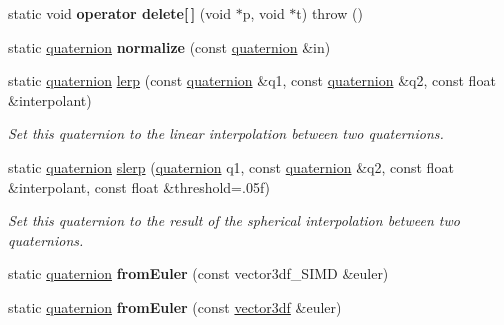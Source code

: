 \begin{DoxyCompactItemize}
\item 
static void {\bfseries operator delete\mbox{[}$\,$\mbox{]}} (void $\ast$p, void $\ast$t)  throw ()\hypertarget{classirr_1_1core_1_1quaternion_abdc0694426887872bbecc1eff5c77279}{}\label{classirr_1_1core_1_1quaternion_abdc0694426887872bbecc1eff5c77279}

\item 
static \hyperlink{classirr_1_1core_1_1quaternion}{quaternion} {\bfseries normalize} (const \hyperlink{classirr_1_1core_1_1quaternion}{quaternion} \&in)\hypertarget{classirr_1_1core_1_1quaternion_a14251b3b9faec080270bf8b8b319862f}{}\label{classirr_1_1core_1_1quaternion_a14251b3b9faec080270bf8b8b319862f}

\item 
static \hyperlink{classirr_1_1core_1_1quaternion}{quaternion} \hyperlink{classirr_1_1core_1_1quaternion_a6ae7bdda648cd5d69904c877b9e0bbb7}{lerp} (const \hyperlink{classirr_1_1core_1_1quaternion}{quaternion} \&q1, const \hyperlink{classirr_1_1core_1_1quaternion}{quaternion} \&q2, const float \&interpolant)
\begin{DoxyCompactList}\small\item\em Set this quaternion to the linear interpolation between two quaternions. \end{DoxyCompactList}\item 
static \hyperlink{classirr_1_1core_1_1quaternion}{quaternion} \hyperlink{classirr_1_1core_1_1quaternion_a590374b0b6f3a5483715de2ed796054b}{slerp} (\hyperlink{classirr_1_1core_1_1quaternion}{quaternion} q1, const \hyperlink{classirr_1_1core_1_1quaternion}{quaternion} \&q2, const float \&interpolant, const float \&threshold=.\+05f)
\begin{DoxyCompactList}\small\item\em Set this quaternion to the result of the spherical interpolation between two quaternions. \end{DoxyCompactList}\item 
static \hyperlink{classirr_1_1core_1_1quaternion}{quaternion} {\bfseries from\+Euler} (const vector3df\+\_\+\+S\+I\+MD \&euler)\hypertarget{classirr_1_1core_1_1quaternion_aab64aa2fb614e9149c7f51f7e305beb4}{}\label{classirr_1_1core_1_1quaternion_aab64aa2fb614e9149c7f51f7e305beb4}

\item 
static \hyperlink{classirr_1_1core_1_1quaternion}{quaternion} {\bfseries from\+Euler} (const \hyperlink{namespaceirr_1_1core_a06f169d08b5c429f5575acb7edbad811}{vector3df} \&euler)\hypertarget{classirr_1_1core_1_1quaternion_a114c75994c12aad798e557382c3c64f7}{}\label{classirr_1_1core_1_1quaternion_a114c75994c12aad798e557382c3c64f7}


\end{DoxyCompactItemize}
